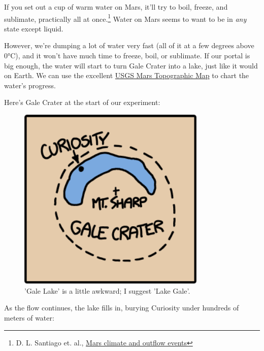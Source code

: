 {{If you set out a cup of warm water on Mars, it'll try to boil, freeze, and sublimate, practically all at once.{\footnote{D. L. Santiago et. al., \href{http://spacescience.arc.nasa.gov/mars-climate-workshop-2012/documents/extendedabstracts/Santiago\_DL\_ExAbst.pdf}{Mars climate and outflow events}} } Water on Mars seems to want to be in \emph{any} state except liquid.}

{However, we're dumping a lot of water very fast (all of it at a few degrees above 0°C), and it won't have much time to freeze, boil, or sublimate. If our portal is big enough, the water will start to turn Gale Crater into a lake, just like it would on Earth. We can use the excellent \href{http://pubs.usgs.gov/imap/i2782/}{USGS Mars Topographic Map} to chart the water's progress.}

{Here's Gale Crater at the start of our experiment:}

\begin{figure}[!htbp]
\centering
\includegraphics[scale=0.5, max width=0.8\textwidth]{imgs/a/54/mars_1.png}
\caption{'Gale Lake' is a little awkward; I suggest 'Lake Gale'.}
\end{figure}

{As the flow continues, the lake fills in, burying Curiosity under hundreds of meters of water:}

}

